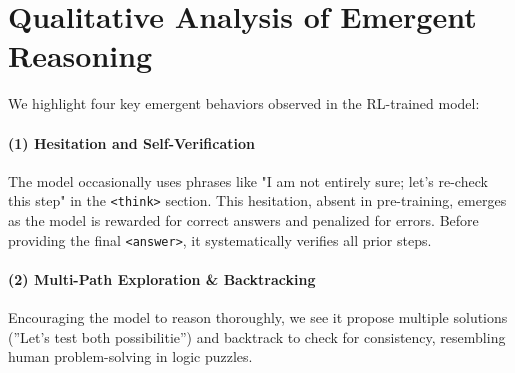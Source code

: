 \section{Qualitative Analysis of Emergent Reasoning}
We highlight four key emergent behaviors observed in the RL-trained model:

\paragraph{(1) Hesitation and Self-Verification}
The model occasionally uses phrases like "I am not entirely sure; let's re-check this step" in the \texttt{<think>} section. This hesitation, absent in pre-training, emerges as the model is rewarded for correct answers and penalized for errors. Before providing the final \texttt{<answer>}, it systematically verifies all prior steps.

\paragraph{(2) Multi-Path Exploration \& Backtracking}
Encouraging the model to reason thoroughly, we see it propose multiple solutions (''Let's test both possibilitie'') and backtrack to check for consistency, resembling human problem-solving in logic puzzles.

